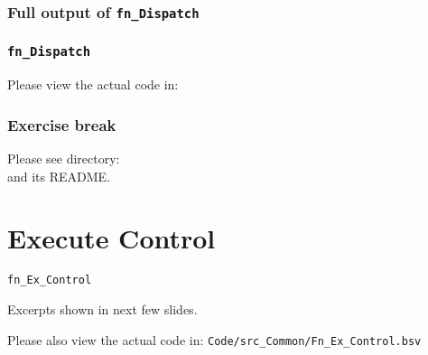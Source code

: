
\begin{frame}[fragile]
\frametitle{Full output of {\tt fn\_Dispatch}}

\footnotesize


\end{frame}


\begin{frame}
\frametitle{{\tt fn\_Dispatch}}

\footnotesize

\begin{center}\large
 Please view the actual code in: 
\end{center}

\end{frame}


\begin{frame}
\frametitle{\EmojiExercise \hmm Exercise break}

Please see directory:  \\
and its README.

\end{frame}


\section{Execute Control}

\begin{frame}[fragile]

\begin{center}
  {\LARGE\tt fn\_Ex\_Control}

  \vspace{5ex}

  Excerpts shown in next few slides.

  Please also view the actual code in:
  {\tt Code/src\_Common/Fn\_Ex\_Control.bsv}

\end{center}

\end{frame}

